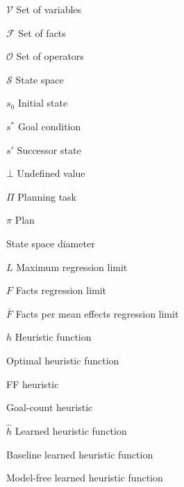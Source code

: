\begin{listofsymbols}{\hgc}
    \item[$\mathcal{V}$] Set of variables
    \item[$\mathcal{F}$] Set of facts
    \item[$\mathcal{O}$] Set of operators
    \item[$\mathcal{S}$] State space
    \item[$s_0$] Initial state
    \item[$s^*$] Goal condition
    \item[$s'$] Successor state
    \item[$\bot$] Undefined value
    \item[$\Pi$] Planning task
    \item[$\pi$] Plan
    \item[\distfarthest] State space diameter
    \item[$L$] Maximum regression limit
    \item[$F$] Facts regression limit
    \item[$\bar F$] Facts per mean effects regression limit
    \item[$h$] Heuristic function
    \item[\hstar] Optimal heuristic function
    \item[\hff] FF heuristic
    \item[\hgc] Goal-count heuristic
    \item[$\hat h$] Learned heuristic function
    \item[\hnnbase] Baseline learned heuristic function
    \item[\hnnnomutex] Model-free learned heuristic function
\end{listofsymbols}
